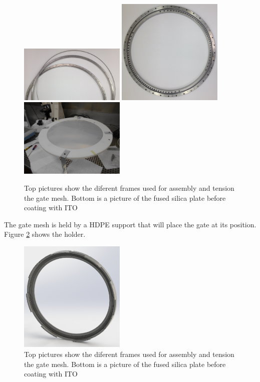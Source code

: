 \begin{figure}[h!]
\centering
\includegraphics[width=0.45\textwidth]{img/mesh_grid_1.jpg}
\includegraphics[width=0.45\textwidth]{img/SS_grids_1.jpg}
\includegraphics[width=0.45\textwidth]{img/Anode_coated.jpg}
\caption{Top pictures show the diferent frames used for assembly and tension the gate mesh. Bottom is a picture of the fused silica plate before coating with ITO} \label{fig:el}
\end{figure}


The gate mesh is held by a HDPE support that will place the gate at its position. Figure \ref{fig:el_support} shows the holder.

\begin{figure}[h!]
\centering
\includegraphics[width=0.45\textwidth]{img/EL_support.jpg}
\caption{Top pictures show the diferent frames used for assembly and tension the gate mesh. Bottom is a picture of the fused silica plate before coating with ITO} \label{fig:el_support}
\end{figure}


